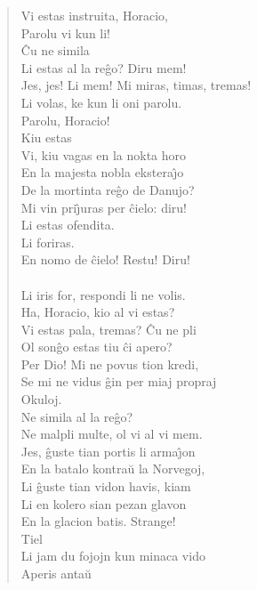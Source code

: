 \begin{verse}
Vi estas instruita, Horacio,\\ Parolu vi kun li!\\
 \^Cu ne simila\\ Li estas al la reĝo? Diru mem!\\
 Jes, jes! Li mem! Mi miras, timas, tremas!\\
 Li volas, ke kun li oni parolu.\\
 Parolu, Horacio!\\
 Kiu estas\\ Vi, kiu vagas
en la nokta horo\\ En la majesta nobla ekstera\^{\j}o\\ De la
mortinta reĝo de Danujo?\\ Mi vin pri\^{\j}uras per \^cielo: diru!\\
 Li estas ofendita.\\
 Li foriras.\\
 En nomo de \^cielo! Restu! Diru!\\
\\
 Li iris for, respondi li ne volis.\\
 Ha, Horacio, kio al vi estas?\\ Vi estas pala, tremas?
\^Cu ne pli\\ Ol son\^go estas tiu \^ci apero?\\
 Per Dio! Mi ne povus tion kredi,\\ Se mi ne vidus \^gin
per miaj propraj\\ Okuloj.\\
 Ne simila al la reĝo?\\
  Ne malpli multe, ol vi al vi mem.\\ Jes, \^guste tian
portis li arma\^{\j}on\\ En la batalo kontra\u u la Norvegoj,\\ Li
\^guste tian vidon havis, kiam\\ Li en kolero sian pezan glavon\\
En la glacion batis. Strange!\\
 Tiel\\ Li jam du fojojn kun minaca vido\\ Aperis anta\u u

\end{verse}
